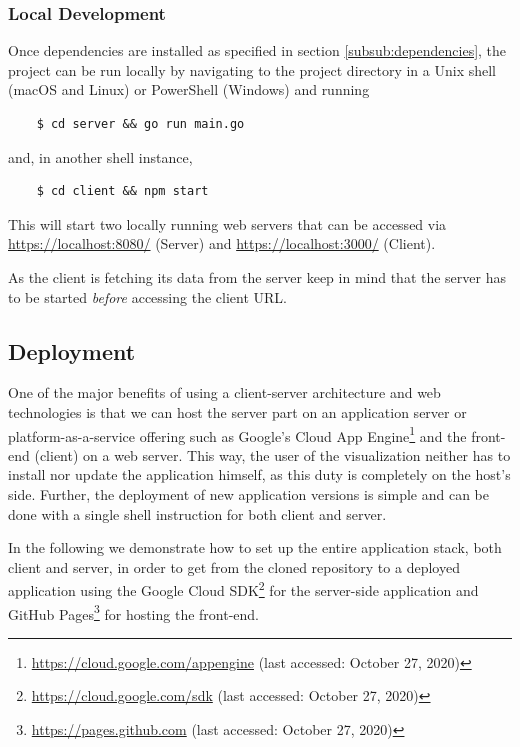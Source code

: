 \subsubsection{Local Development}
Once dependencies are installed as specified in section \ref{subsub:dependencies}, the project can be run locally by navigating to the project directory in a Unix shell (macOS and Linux) or PowerShell (Windows) and running

\begin{verbatim}
    $ cd server && go run main.go
\end{verbatim}
and, in another shell instance,
\begin{verbatim}
    $ cd client && npm start
\end{verbatim}

This will start two locally running web servers that can be accessed via \url{https://localhost:8080/} (Server) and \url{https://localhost:3000/} (Client).

\begin{note}
As the client is fetching its data from the server keep in mind that the server has to be started \textit{before} accessing the client URL.
\end{note}

\subsection{Deployment}

One of the major benefits of using a client-server architecture and web technologies is that we can host the server part on an application server or platform-as-a-service offering such as Google's Cloud App Engine\footnote{\url{https://cloud.google.com/appengine} (last accessed: October 27, 2020)} and the front-end (client) on a web server.
This way, the user of the visualization neither has to install nor update the application himself, as this duty is completely on the host's side. Further, the deployment of new application versions is simple and can be done with a single shell instruction for both client and server.

In the following we demonstrate how to set up the entire application stack, both client and server, in order to get from the cloned repository to a deployed application using the Google Cloud SDK\footnote{\url{https://cloud.google.com/sdk} (last accessed: October 27, 2020)} for the server-side application and GitHub Pages\footnote{\url{https://pages.github.com} (last accessed: October 27, 2020)} for hosting the front-end.
\newpage


